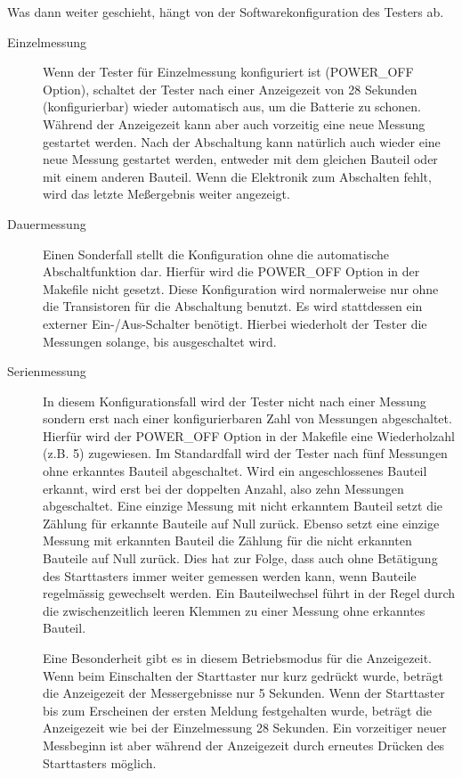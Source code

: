 Was dann weiter geschieht, hängt von der Softwarekonfiguration des Testers ab.
\begin{description}
  \item[Einzelmessung] Wenn der Tester für Einzelmessung konfiguriert ist (POWER\_OFF Option),
 schaltet der Tester nach einer Anzeigezeit
von 28 Sekunden (konfigurierbar) wieder automatisch aus, um die Batterie zu schonen.
Während der Anzeigezeit kann aber auch vorzeitig eine neue Messung gestartet werden.
Nach der Abschaltung kann natürlich auch wieder eine
neue Messung gestartet werden, entweder mit dem gleichen Bauteil oder mit einem anderen Bauteil.
Wenn die Elektronik zum Abschalten fehlt, wird das letzte Meßergebnis weiter angezeigt.

  \item[Dauermessung] Einen Sonderfall stellt die Konfiguration ohne die automatische Abschaltfunktion dar.
Hierfür wird die POWER\_OFF Option in der Makefile nicht gesetzt.
Diese Konfiguration wird normalerweise nur ohne die Transistoren für die Abschaltung benutzt.
Es wird stattdessen ein externer Ein-/Aus-Schalter benötigt. Hierbei wiederholt der Tester die
Messungen solange, bis ausgeschaltet wird.

  \item[Serienmessung] In diesem Konfigurationsfall wird der Tester nicht nach einer Messung sondern erst nach einer konfigurierbaren
Zahl von Messungen abgeschaltet. Hierfür wird der POWER\_OFF Option in der Makefile eine Wiederholzahl (z.B. 5) zugewiesen.
Im Standardfall wird der Tester nach fünf Messungen ohne erkanntes Bauteil abgeschaltet.
Wird ein angeschlossenes Bauteil erkannt, wird erst bei der doppelten Anzahl, also zehn Messungen abgeschaltet.
Eine einzige Messung mit nicht erkanntem Bauteil setzt die Zählung für erkannte Bauteile auf Null zurück.
Ebenso setzt eine einzige Messung mit erkannten Bauteil die Zählung für die nicht erkannten Bauteile auf Null zurück.
Dies hat zur Folge, dass auch ohne Betätigung des Starttasters immer weiter gemessen werden kann,
 wenn Bauteile regelmässig gewechselt werden.
Ein Bauteilwechsel führt in der Regel durch die zwischenzeitlich leeren Klemmen zu einer Messung ohne erkanntes Bauteil.

Eine Besonderheit gibt es in diesem Betriebsmodus für die Anzeigezeit. Wenn beim Einschalten der Starttaster nur kurz
gedrückt wurde, beträgt die Anzeigezeit der Messergebnisse nur 5 Sekunden. Wenn der Starttaster bis zum Erscheinen der
ersten Meldung festgehalten wurde, beträgt die Anzeigezeit wie bei der Einzelmessung 28 Sekunden.
Ein vorzeitiger neuer Messbeginn ist aber während der Anzeigezeit durch erneutes Drücken des Starttasters möglich.

\end{description}

